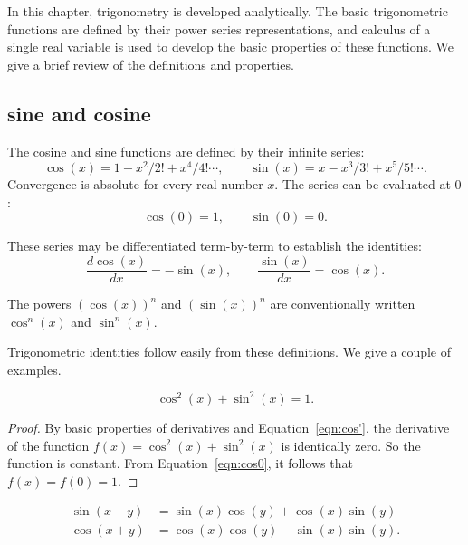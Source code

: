 



In this chapter, trigonometry is developed analytically.  The basic
trigonometric functions are defined by their power series
representations, and calculus of a single real variable is used to
develop the basic properties of these functions.  We give a brief
review of the definitions and properties.


\subsection{sine and cosine}

The cosine and sine functions are defined by their infinite series:
    \begin{equation}\label{eqn:cos-def}\cos(x) = 1 - x^2/2! + x^4/4! \cdots,\qquad
  \sin(x) = x - x^3/3! + x^5/5! \cdots.
    \end{equation}
Convergence is absolute for every real number $x$.
The series can be evaluated at $0$:
    \begin{equation}\label{eqn:cos0}
    \cos(0) = 1,\qquad \sin(0) = 0.
    \end{equation}

These series may be differentiated term-by-term to establish the identities:
    \begin{equation}\label{eqn:cos'}
    \frac{d \cos(x)}{dx} = -\sin(x),\qquad \frac{ \sin(x)}{dx} = \cos(x).
    \end{equation}

The powers $(\cos(x))^n$ and $(\sin(x))^n$ are conventionally written
$\cos^n(x)$ and $\sin^n(x)$.

Trigonometric identities follow easily from these definitions.  We
give a couple of examples.

\begin{lemma}\label{lemma:circle}
   $$\cos^2(x) + \sin^2(x) = 1.$$
\end{lemma}

\begin{proof}
By basic properties of derivatives and Equation~\ref{eqn:cos'},
the derivative of the function $f(x) = \cos^2(x) +\sin^2(x)$ is
identically zero.   So the function is constant.  From
Equation~\ref{eqn:cos0}, it follows that $f(x)=f(0)=1$.
\end{proof}

\begin{lemma}\label{lemma:sin-add}
  $$\begin{array}{lll}
  \sin(x+y) &= \sin(x)\cos(y) + \cos(x)\sin(y)\\
  \cos(x+y)  &= \cos(x)\cos(y) - \sin(x)\sin(y).
  \end{array}$$
\end{lemma}


